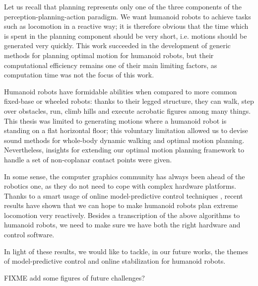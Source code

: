 Let us recall that planning represents only one of the three
components of the perception-planning-action paradigm. We want
humanoid robots to achieve tasks such as locomotion in a reactive way;
it is therefore obvious that the time which is spent in the planning
component should be very short, i.e. motions should be generated very
quickly. This work succeeded in the development of generic methods for
planning optimal motion for humanoid robots, but their computational
efficiency remains one of their main limiting factors, as computation
time was not the focus of this work.

Humanoid robots have formidable abilities when compared to more common
fixed-base or wheeled robots: thanks to their legged structure, they
can walk, step over obstacles, run, climb hills and execute acrobatic
figures among many things. This thesis was limited to generating
motions where a humanoid robot is standing on a flat horizontal floor;
this voluntary limitation allowed us to devise sound methods for
whole-body dynamic walking and optimal motion planning. Nevertheless,
insights for extending our optimal motion planning framework to handle
a set of non-coplanar contact points were given.

In some sense, the computer graphics community has always been ahead
of the robotics one, as they do not need to cope with complex hardware
platforms. Thanks to a smart usage of online model-predictive control
techniques \cite{coros2010generalized,tassa2012synthesis}, recent
results have shown that we can hope to make humanoid robots plan
extreme locomotion very reactively. Besides a transcription of the
above algorithms to humanoid robots, we need to make sure we have both
the right hardware and control software.

\bigskip

In light of these results, we would like to tackle, in our future
works, the themes of model-predictive control and online stabilization
for humanoid robots.

\bigskip

FIXME add some figures of future challenges?

